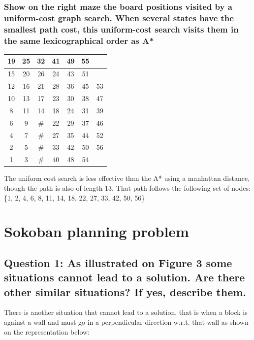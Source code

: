\documentclass[a4paper,10pt]{article}
\begin{document}
			\subsubsection{Show on the right maze the board positions visited by a uniform-cost graph search. When several states have the smallest path cost, this uniform-cost search visits them in the same lexicographical order as A*}
			 \begin{center}
				\begin{tabular}{|c|c|c|c|c|c|c|}
					\hline 
					19 & 25 & 32 & 41 & 49 & 55 &    \\ 
					\hline 
					15 & 20 & 26 & 24 & 43 & 51 &    \\ 
					\hline 
					12 & 16 & 21 & 28 & 36 & 45 & 53 \\ 
					\hline 
					10 & 13 & 17 & 23 & 30 & 38 & 47 \\ 
					\hline 
					8  & 11 & 14 & 18 & 24 & 31 & 39 \\ 
					\hline 
					6  & 9  & \# & 22 & 29 & 37 & 46 \\ 
					\hline 
					4  & 7  & \# & 27 & 35 & 44 & 52 \\ 
					\hline 
					2  & 5  & \# & 33 & 42 & 50 & 56 \\ 
					\hline 
					1  & 3  & \# & 40 & 48 & 54 &    \\ 
					\hline 
				\end{tabular} 
			\end{center}
				The uniform cost search is less effective than the A* using a manhattan distance, though the path is also of length 13. That path follows the following set of nodes: \{1, 2, 4, 6, 8, 11, 14, 18, 22, 27, 33, 42, 50, 56\}
			
	\newpage
	
	\section{Sokoban planning problem}
	
		\subsection{Question 1: As illustrated on Figure 3 some situations cannot lead to a solution. Are there other similar situations? If yes, describe them.}
			
			There is another situation that cannot lead to a solution, that is when a block is against a wall and must go in a perpendicular direction w.r.t. that wall as shown on the representation below: \\
\end{document}
